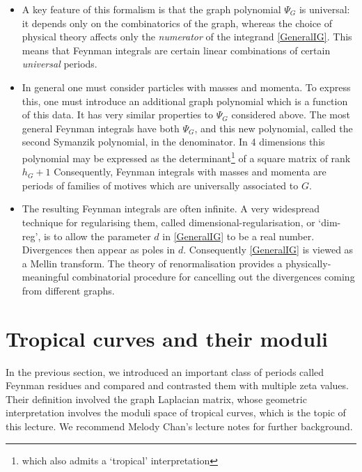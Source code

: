 \documentclass[12pt]{amsart}
\theoremstyle{plain}
\newcommand{\0}{\color{blue}{\mathsf{0}}}
\begin{document}
\begin{itemize}
    \item      A key feature of this formalism is that the graph polynomial $\Psi_G$
 is universal: it depends only on the combinatorics of the graph, whereas the choice of physical theory affects only the \emph{numerator} of the integrand \eqref{GeneralIG}. 
    This means that Feynman integrals are certain linear combinations of certain \emph{universal}  periods. 



 
\item  In general one must consider particles with masses and momenta. To express this, one must introduce an additional graph polynomial  which is a function of this data. It has very similar properties to $\Psi_G$ considered above.   The most general Feynman integrals have both $\Psi_G$, and this  new polynomial, called the second Symanzik polynomial, in the denominator. In 4 dimensions this polynomial may  be expressed as the determinant\footnote{which also admits a `tropical' interpretation} of a square matrix of rank $h_G+1$ \cite{BrLaplacian}
Consequently,  Feynman integrals with masses and momenta are  periods of families of  motives which are universally associated to  $G$.  

\item The resulting Feynman integrals are often infinite. A very widespread technique for regularising them, called dimensional-regularisation, or `dim-reg', is to allow the parameter $d$ in  \eqref{GeneralIG} to be a real number. Divergences then appear as poles in $d$.  Consequently  \eqref{GeneralIG} is  viewed as a Mellin transform. The theory of renormalisation provides a physically-meaningful combinatorial procedure for cancelling out the divergences  coming from different graphs. 
\end{itemize}






  









\section{Tropical curves and their moduli}

In the previous section, we introduced an important class of periods called Feynman residues and compared and contrasted them with multiple zeta values. Their definition involved the graph Laplacian matrix, whose geometric interpretation involves the moduli space of tropical curves, which is the topic of this lecture.  We recommend Melody Chan's lecture notes \cite{MelodyTropicalLectures} for further background. 
  
\end{document}
